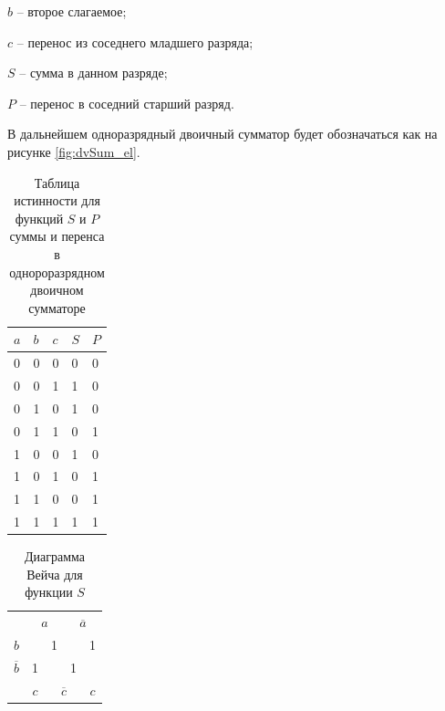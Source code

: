 \documentclass[a4paper,14pt]{article}
\begin{document}
$b$ -- второе слагаемое;

$c$ -- перенос из соседнего младшего разряда;

$S$ -- сумма в данном разряде;

$P$ -- перенос в соседний старший разряд.

В дальнейшем одноразрядный двоичный сумматор будет обозначаться как на рисунке \ref{fig:dvSum_el}.

\begin{table}[H]
\begin{center}
	\caption{\label{tab:dvSum} Таблица истинности для функций $S$ и $P$ суммы и перенса в однороразрядном двоичном сумматоре}
	\begin{tabular}{|l|l|l|l|l|}
		\hline
		$a$ & $b$ & $c$ & $S$ & $P$ \\ \hline
		0 & 0 & 0 & 0 & 0 \\ \hline
		0 & 0 & 1 & 1 & 0 \\ \hline
		0 & 1 & 0 & 1 & 0 \\ \hline
		0 & 1 & 1 & 0 & 1 \\ \hline
		1 & 0 & 0 & 1 & 0 \\ \hline
		1 & 0 & 1 & 0 & 1 \\ \hline
		1 & 1 & 0 & 0 & 1 \\ \hline
		1 & 1 & 1 & 1 & 1 \\ \hline
	\end{tabular}
\end{center}
\end{table}

\begin{table}[H]
	\begin{center}
		\caption{\label{tab:SDvSum} Диаграмма Вейча для функции $S$}
	\begin{tabular}{ccccc}
		& \multicolumn{2}{c}{$a$}                           & \multicolumn{2}{c}{$\overline{a}$}                          \\ \cline{2-5} 
		\multicolumn{1}{c|}{$b$}  & \multicolumn{1}{c|}{}  & \multicolumn{1}{c|}{1} & \multicolumn{1}{c|}{}  & \multicolumn{1}{c|}{1} \\ \cline{2-5} 
		\multicolumn{1}{c|}{$\overline{b}$} & \multicolumn{1}{c|}{1} & \multicolumn{1}{c|}{}  & \multicolumn{1}{c|}{1} & \multicolumn{1}{c|}{}  \\ \cline{2-5} 
		& $c$                     & \multicolumn{2}{c}{$\overline{c}$}                          & $c$                     
	\end{tabular}
\end{center}
\end{table}
\end{document}
